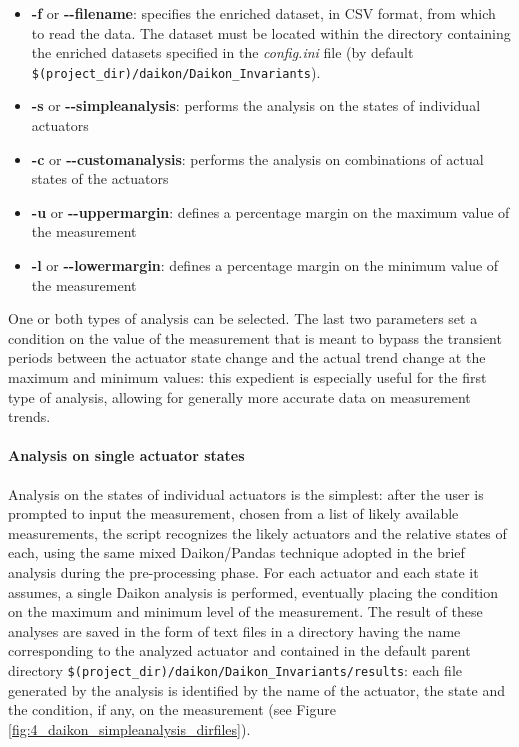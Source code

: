 \begin{itemize}
	\item \textbf{-f} or \textbf{{-}{-}filename}: specifies the enriched dataset, in CSV format, from which to read the data. The dataset must be located within the directory containing the enriched datasets specified in the \textit{config.ini} file (by default \texttt{\$(project\_dir)/daikon/Daikon\_Invariants}).
	
	\item \textbf{-s} or \textbf{{-}{-}simpleanalysis}: performs the analysis on the states of individual actuators
	
	\item \textbf{-c} or \textbf{{-}{-}customanalysis}: performs the analysis on combinations of actual states of the actuators
	
	\item \textbf{-u} or \textbf{{-}{-}uppermargin}: defines a percentage margin on the maximum value of the measurement
	
	\item \textbf{-l} or \textbf{{-}{-}lowermargin}: defines a percentage margin on the minimum value of the measurement
\end{itemize}
One or both types of analysis can be selected. The last two parameters set a condition on the value of the measurement that is meant to bypass the transient periods between the actuator state change and the actual trend change at the maximum and minimum values: this expedient is especially useful for the first type of analysis, allowing for generally more accurate data on measurement trends.

\paragraph{Analysis on single actuator states}
Analysis on the states of individual actuators is the simplest: after the user is prompted to input the measurement, chosen from a list of likely available measurements, the script recognizes the likely actuators and the relative states of each, using the same mixed Daikon/Pandas technique adopted in the brief analysis during the pre-processing phase.\newline
For each actuator and each state it assumes, a single Daikon analysis is performed, eventually placing the condition on the maximum and minimum level of the measurement.\newline 
The result of these analyses are saved in the form of text files in a directory having the name corresponding to the analyzed actuator and contained in the default parent directory \texttt{\$(project\_dir)/daikon/Daikon\_Invariants/results}: each file generated by the analysis is identified by the name of the actuator, the state and the condition, if any, on the measurement (see Figure \ref{fig:4_daikon_simpleanalysis_dirfiles}).

